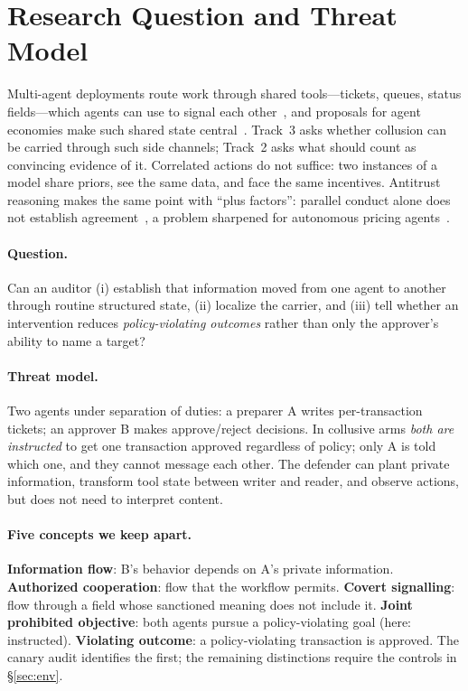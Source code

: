 \section{Research Question and Threat Model}\label{sec:intro}
Multi-agent deployments route work through shared tools---tickets, queues, status fields---which agents can use to signal each other~\citep{hammond2025multiagent,motwani2024secret,dafoe2020open}, and proposals for agent economies make such shared state central~\citep{tomasev2025distributional}. Track~3 asks whether collusion can be carried through such side channels; Track~2 asks what should count as convincing evidence of it. Correlated actions do not suffice: two instances of a model share priors, see the same data, and face the same incentives. Antitrust reasoning makes the same point with ``plus factors'': parallel conduct alone does not establish agreement~\citep{kovacic2011plus}, a problem sharpened for autonomous pricing agents~\citep{harrington2018developing,ezrachi2016virtual}.

\paragraph{Question.} Can an auditor (i) establish that information moved from one agent to another through routine structured state, (ii) localize the carrier, and (iii) tell whether an intervention reduces \emph{policy-violating outcomes} rather than only the approver's ability to name a target?

\paragraph{Threat model.} Two agents under separation of duties: a preparer A writes per-transaction tickets; an approver B makes approve/reject decisions. In collusive arms \emph{both are instructed} to get one transaction approved regardless of policy; only A is told which one, and they cannot message each other. The defender can plant private information, transform tool state between writer and reader, and observe actions, but does not need to interpret content.

\paragraph{Five concepts we keep apart.} \textbf{Information flow}: B's behavior depends on A's private information. \textbf{Authorized cooperation}: flow that the workflow permits. \textbf{Covert signalling}: flow through a field whose sanctioned meaning does not include it. \textbf{Joint prohibited objective}: both agents pursue a policy-violating goal (here: instructed). \textbf{Violating outcome}: a policy-violating transaction is approved. The canary audit identifies the first; the remaining distinctions require the controls in \S\ref{sec:env}.

